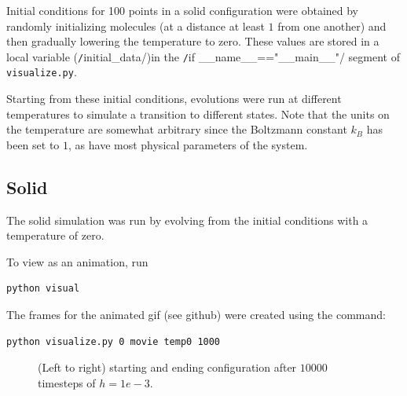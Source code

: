 \documentclass[12pt]{article}
\begin{document}
Initial conditions for 100 points in a solid configuration
were obtained by randomly initializing
molecules (at a distance at least $1$ from one another) and then gradually
lowering the temperature to zero. These values are stored in a local
variable (\texttt/initial_data/)in the
\texttt/if __name__=="__main__"/ segment of \texttt{visualize.py}.

Starting from these initial conditions, evolutions were run at different
temperatures to simulate a transition to different states. Note that the
units on the temperature are somewhat arbitrary since the Boltzmann constant
$k_B$ has been set to $1$, as have most physical parameters of the system.

\subsection{Solid}

The solid simulation was run by evolving from the initial conditions with
a temperature of zero.

To view as an animation, run

\begin{verbatim}
python visual
\end{verbatim}

The frames for the animated gif (see github) were created using the command:

\begin{verbatim}
python visualize.py 0 movie temp0 1000
\end{verbatim}

\begin{figure}[H]
  \caption{(Left to right) starting and ending configuration after $10000$
    timesteps of $h = 1e-3$.}
\end{figure}
\end{document}
